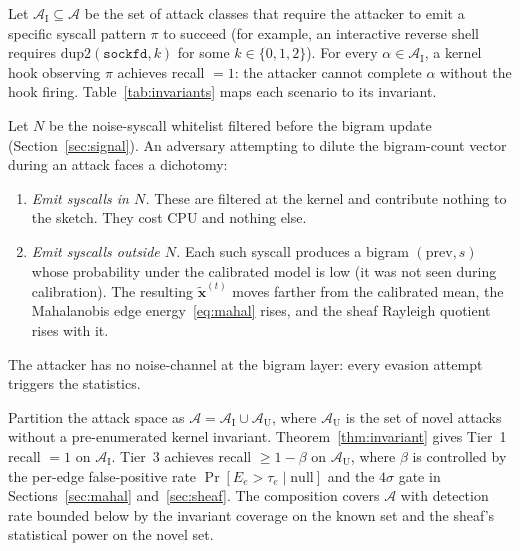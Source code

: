 \begin{theorem}\label{thm:invariant}
Let $\mathcal{A}_{\text{I}} \subseteq \mathcal{A}$ be the set of attack
classes that require the attacker to emit a specific syscall pattern $\pi$
to succeed (for example, an interactive reverse shell requires
$\mathrm{dup2}(\texttt{sockfd}, k)$ for some $k \in \{0,1,2\}$). For every
$\alpha \in \mathcal{A}_{\text{I}}$, a kernel hook observing $\pi$ achieves
recall $= 1$: the attacker cannot complete $\alpha$ without the hook
firing. Table~\ref{tab:invariants} maps each scenario to its invariant.
\end{theorem}

\begin{theorem}\label{thm:bigram}
Let $N$ be the noise-syscall whitelist filtered before the bigram update
(Section~\ref{sec:signal}). An adversary attempting to dilute the
bigram-count vector during an attack faces a dichotomy:
\begin{enumerate}
  \item \textit{Emit syscalls in $N$.} These are filtered at the kernel and
  contribute nothing to the sketch. They cost CPU and nothing else.
  \item \textit{Emit syscalls outside $N$.} Each such syscall produces a
  bigram $(\mathrm{prev}, s)$ whose probability under the calibrated model
  is low (it was not seen during calibration). The resulting
  $\tilde{\mathbf{x}}^{(t)}$ moves farther from the calibrated mean, the
  Mahalanobis edge energy~\eqref{eq:mahal} rises, and the sheaf Rayleigh
  quotient rises with it.
\end{enumerate}
The attacker has no noise-channel at the bigram layer: every evasion
attempt triggers the statistics.
\end{theorem}

\begin{theorem}\label{thm:completeness}
Partition the attack space as $\mathcal{A} = \mathcal{A}_{\text{I}} \cup
\mathcal{A}_{\text{U}}$, where $\mathcal{A}_{\text{U}}$ is the set of novel
attacks without a pre-enumerated kernel invariant. Theorem~\ref{thm:invariant}
gives Tier~1 recall $= 1$ on $\mathcal{A}_{\text{I}}$. Tier~3 achieves
recall $\geq 1 - \beta$ on $\mathcal{A}_{\text{U}}$, where $\beta$ is
controlled by the per-edge false-positive rate $\Pr[E_e > \tau_e \mid
\text{null}]$ and the $4\sigma$ gate in Sections~\ref{sec:mahal}
and~\ref{sec:sheaf}. The composition covers $\mathcal{A}$ with detection
rate bounded below by the invariant coverage on the known set and the
sheaf's statistical power on the novel set.
\end{theorem}

